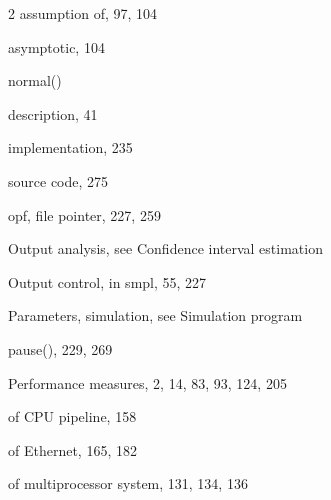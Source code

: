 \begin{multicols}{2}
\quad assumption of, 97, 104\par
\quad asymptotic, 104\par
\noindent normal()\par
\quad description, 41\par
\quad implementation, 235\par
\quad source code, 275\par
\noindent opf, file pointer, 227, 259\par
\noindent Output analysis, see Confidence interval estimation\par
\noindent Output control, in smpl, 55, 227\par
\noindent Parameters, simulation, see Simulation program\par
\noindent pause(), 229, 269\par
\noindent Performance measures, 2, 14, 83, 93, 124, 205\par
\quad of CPU pipeline, 158\par
\quad of Ethernet, 165, 182\par
\quad of multiprocessor system, 131, 134, 136\par
\end{multicols}
